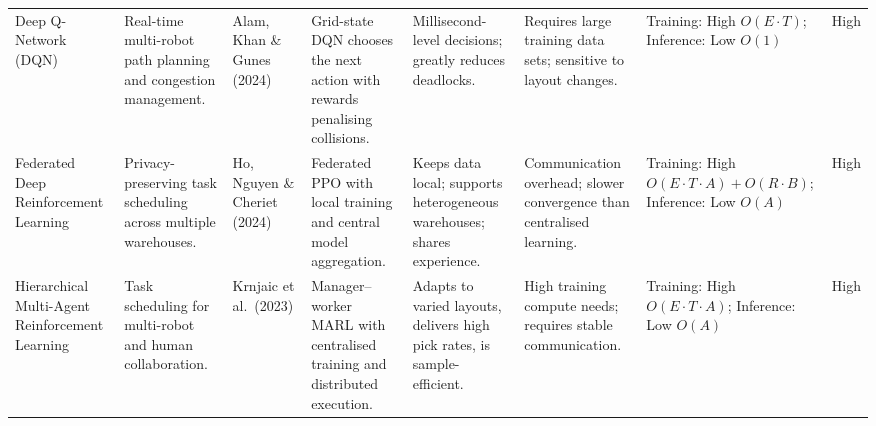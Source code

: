 \documentclass[journal]{IEEEtran}
\begin{document}
\begin{table*}[t!]
{\begin{tabular}{p{2.7cm}p{4.9cm}p{3.2cm}p{4.8cm}p{3.8cm}p{4.2cm}p{2.8cm}p{3.2cm}}
      Deep Q-Network (DQN) &
      Real-time multi-robot path planning and congestion management. &
      Alam, Khan \& Gunes (2024) &
      Grid-state DQN chooses the next action with rewards penalising collisions. &
      Millisecond-level decisions; greatly reduces deadlocks. &
      Requires large training data sets; sensitive to layout changes. &
      Training: High $O(E\!\cdot\!T)$; Inference: Low $O(1)$ & High \\[2pt]

      Federated Deep Reinforcement Learning &
      Privacy-preserving task scheduling across multiple warehouses. &
      Ho, Nguyen \& Cheriet (2024) &
      Federated PPO with local training and central model aggregation. &
      Keeps data local; supports heterogeneous warehouses; shares experience. &
      Communication overhead; slower convergence than centralised learning. &
      Training: High $O(E\!\cdot\!T\!\cdot\!A)+O(R\!\cdot\!B)$; Inference: Low $O(A)$ & High \\[2pt]

      Hierarchical Multi-Agent Reinforcement Learning &
      Task scheduling for multi-robot and human collaboration. &
      Krnjaic et al.\ (2023) &
      Manager–worker MARL with centralised training and distributed execution. &
      Adapts to varied layouts, delivers high pick rates, is sample-efficient. &
      High training compute needs; requires stable communication. &
      Training: High $O(E\!\cdot\!T\!\cdot\!A)$; Inference: Low $O(A)$ & High \\[2pt]
    \bottomrule
  \end{tabular}}
\end{table*}




\end{document}
